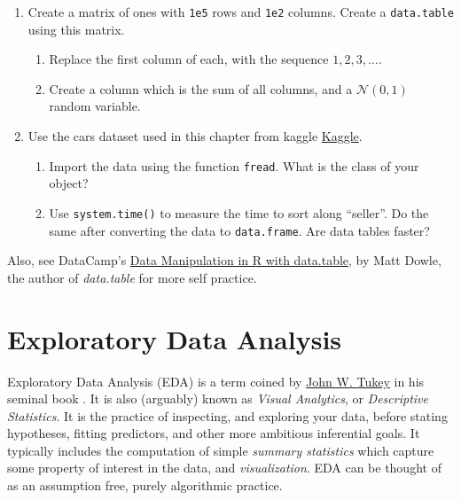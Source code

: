 \documentclass[]{book}
\providecommand{\tightlist}{%
  \setlength{\itemsep}{0pt}\setlength{\parskip}{0pt}}
\theoremstyle{definition}
\theoremstyle{definition}
\theoremstyle{definition}
\theoremstyle{remark}
\begin{document}
\begin{enumerate}
\def\labelenumi{\arabic{enumi}.}
\tightlist
\item
  Create a matrix of ones with \texttt{1e5} rows and \texttt{1e2}
  columns. Create a \texttt{data.table} using this matrix.

  \begin{enumerate}
  \def\labelenumii{\arabic{enumii}.}
  \tightlist
  \item
    Replace the first column of each, with the sequence \(1,2,3,\dots\).
  \item
    Create a column which is the sum of all columns, and a
    \(\mathcal{N}(0,1)\) random variable.
  \end{enumerate}
\item
  Use the cars dataset used in this chapter from kaggle
  \href{https://www.kaggle.com/orgesleka/used-cars-database}{Kaggle}.

  \begin{enumerate}
  \def\labelenumii{\arabic{enumii}.}
  \tightlist
  \item
    Import the data using the function \texttt{fread}. What is the class
    of your object?
  \item
    Use \texttt{system.time()} to measure the time to sort along
    ``seller''. Do the same after converting the data to
    \texttt{data.frame}. Are data tables faster?
  \end{enumerate}
\end{enumerate}

Also, see DataCamp's
\href{https://www.datacamp.com/courses/data-manipulation-in-r-with-datatable}{Data
Manipulation in R with data.table}, by Matt Dowle, the author of
\emph{data.table} for more self practice.

\chapter{Exploratory Data Analysis}\label{eda}

Exploratory Data Analysis (EDA) is a term coined by
\href{https://en.wikipedia.org/wiki/John_Tukey}{John W. Tukey} in his
seminal book \citep{tukey1977exploratory}. It is also (arguably) known
as \emph{Visual Analytics}, or \emph{Descriptive Statistics}. It is the
practice of inspecting, and exploring your data, before stating
hypotheses, fitting predictors, and other more ambitious inferential
goals. It typically includes the computation of simple \emph{summary
statistics} which capture some property of interest in the data, and
\emph{visualization}. EDA can be thought of as an assumption free,
purely algorithmic practice.
\end{document}
